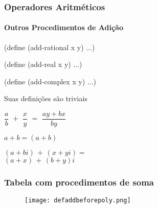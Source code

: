 \begin{frame}[fragile]
  \frametitle{Operadores Aritméticos}
  \framesubtitle{Outros Procedimentos de Adição}
  \begin{minipage}{0.50\textwidth}
    \begin{code}
(define (add-rational x y)
  ...)
    \end{code}
    \pause

    \vspace{1.0cm}
    \begin{code}
(define (add-real x y)
  ...)
    \end{code}
    \pause

    \vspace{1.0cm}
    \begin{code}
(define (add-complex x y)
  ...)
    \end{code}
    \pause

  \end{minipage}
  \hfill
  \begin{minipage}{0.45\textwidth}
    Suas definições são triviais

    \pause

    \vspace{0.75cm}
    $\dfrac{a}{b}\,\,+\,\,\dfrac{x}{y}\,\,=\,\,\dfrac{ay + bx}{by}$

    \vspace{0.75cm}
    $a + b = (a + b)$

    \vspace{0.75cm}
    $(a + bi)\,+\,(x + yi) =$\\
    $(a + x)\,+\,(b + y)i$
  \end{minipage}
\end{frame}



\begin{frame}
  \frametitle{Tabela com procedimentos de soma}
  \begin{figure}
    \centering
    \texttt{[image: defaddbeforepoly.png]}
  \end{figure}
\end{frame}


